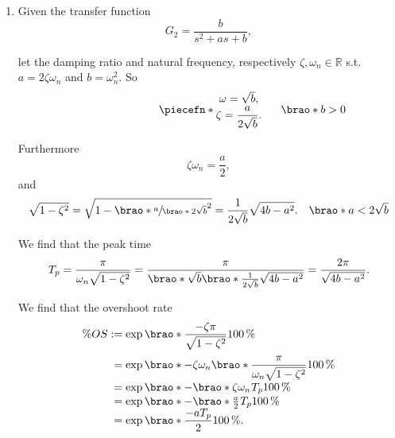 \documentclass[12pt]{article}
\DeclarePairedDelimiter\brao()%
\DeclarePairedDelimiter\piecefn\{.
\begin{document}
\begin{enumerate}
    \item
        Given the transfer function
        \begin{equation}
            G_2 = \frac{b}{s^2 + as + b},
        \end{equation}
        
        let the damping ratio and natural frequency, respectively $\zeta, \omega_n \in \mathbb{R}$ s.t. $a = 2\zeta\omega_n$ and $b = \omega_n^2$. So
        \begin{equation}
            \piecefn*{
                \begin{matrix}
                    \omega = \sqrt{b}\rlap, \\*
                    \zeta = \dfrac{a}{2\sqrt{b}}\rlap. \\*
                \end{matrix}
            }\rlap{$\qquad\brao*{b > 0}$}
        \end{equation}

        Furthermore
        \begin{equation}
            \zeta\omega_n = \frac{a}2,
        \end{equation}
        and
        \begin{equation}
            \sqrt{1 - \zeta^2} = \sqrt{1 - \brao*{\sfrac{a}{\brao*{2\sqrt{b}}}}^2} = \frac{1}{2\sqrt{b}} \sqrt{4b - a^2}.%
            \hskip1em\brao*{a < 2\sqrt{b}}
        \end{equation}
        
        We find that the peak time
        \begin{equation}
            T_p = \frac\pi{\omega_n \sqrt{1 - \zeta^2}} = \frac\pi{\brao*{\sqrt{b}}\brao*{ \frac{1}{2\sqrt{b}}\sqrt{4b - a^2}}} = \frac{2\pi}{\sqrt{4b - a^2}}.
        \end{equation}

        We find that the overshoot rate
        \begin{equation}
            \begin{array}{*2{@{}r}@{}l@{}}
                \% OS
                &{}:={}& \exp\brao*{\dfrac{-\zeta\pi}{\sqrt{1 - \zeta^2}}} \SI{100}\percent
            \\*[1.3em]
                &{}={}& \exp\brao*{-\zeta\omega_n\brao*{\dfrac{\pi}{\omega_n\sqrt{1 - \zeta^2}}}} \SI{100}\percent
            \\*
                &{}={}& \exp\brao*{-\brao*{\zeta\omega_n}^{\vphantom{1}}T_p} \SI{100}\percent
            \\*
                &{}={}& \exp\brao*{-\brao*{\tfrac{a}2}^{\vphantom{1}}T_p} \SI{100}\percent
            \\*
                & {}={} & \exp\brao*{\dfrac{-aT_p}{2}} \SI{100}\percent\rlap.
            \\*
            \end{array}
        \end{equation}


\end{enumerate}
\end{document}
